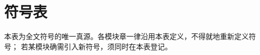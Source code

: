 %

\chapter*{符号表}

本表为全文符号的唯一真源。各模块章一律沿用本表定义，不得就地重新定义符号；
若某模块确需引入新符号，须同时在本表登记。

\vspace{0.5em}
\small
